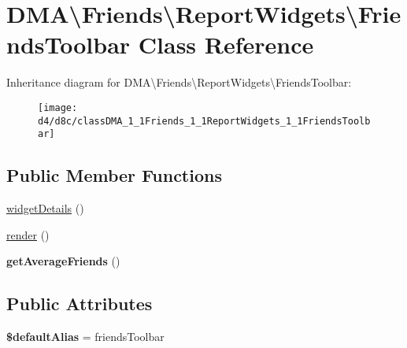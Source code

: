\hypertarget{classDMA_1_1Friends_1_1ReportWidgets_1_1FriendsToolbar}{}\section{D\+M\+A\textbackslash{}Friends\textbackslash{}Report\+Widgets\textbackslash{}Friends\+Toolbar Class Reference}
\label{classDMA_1_1Friends_1_1ReportWidgets_1_1FriendsToolbar}
Inheritance diagram for D\+M\+A\textbackslash{}Friends\textbackslash{}Report\+Widgets\textbackslash{}Friends\+Toolbar\+:\begin{figure}[H]
\begin{center}
\leavevmode
\texttt{[image: d4/d8c/classDMA\_1\_1Friends\_1\_1ReportWidgets\_1\_1FriendsToolbar]}
\end{center}
\end{figure}
\subsection*{Public Member Functions}
\begin{DoxyCompactItemize}
\item 
\hyperlink{classDMA_1_1Friends_1_1ReportWidgets_1_1FriendsToolbar_a56951946e166c46353910da4a5c399a1}{widget\+Details} ()
\item 
\hyperlink{classDMA_1_1Friends_1_1ReportWidgets_1_1FriendsToolbar_a5fb3de1ff5dd5186e068dcf8c5e8d154}{render} ()
\item 
\hypertarget{classDMA_1_1Friends_1_1ReportWidgets_1_1FriendsToolbar_a6f0b603938f9468c37716f2aab808e62}{}{\bfseries get\+Average\+Friends} ()\label{classDMA_1_1Friends_1_1ReportWidgets_1_1FriendsToolbar_a6f0b603938f9468c37716f2aab808e62}

\end{DoxyCompactItemize}
\subsection*{Public Attributes}
\begin{DoxyCompactItemize}
\item 
\hypertarget{classDMA_1_1Friends_1_1ReportWidgets_1_1FriendsToolbar_aabef17c5a99fc5f66554a91dd2cde59d}{}{\bfseries \$default\+Alias} = \textquotesingle{}friends\+Toolbar\textquotesingle{}\label{classDMA_1_1Friends_1_1ReportWidgets_1_1FriendsToolbar_aabef17c5a99fc5f66554a91dd2cde59d}

\end{DoxyCompactItemize}


